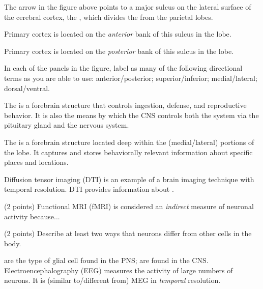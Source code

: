 \documentclass[]{exam}
\begin{document}
\begin{questions}
\question The arrow in the figure above points to a major sulcus on the lateral surface of the cerebral cortex, the \fillin, which divides the \fillin from the parietal lobes.

\question Primary \fillin cortex is located on the \emph{anterior} bank of this sulcus in the \fillin lobe.

\question Primary \fillin cortex is located on the \emph{posterior} bank of this sulcus in the \fillin lobe.

\question In each of the panels in the figure, label as many of the following directional terms as you are able to use: anterior/posterior; superior/inferior; medial/lateral; dorsal/ventral. 

\question The \fillin is a forebrain structure that controls ingestion, defense, and reproductive behavior. It is also the means by which the CNS controls both the \fillin system via the pituitary gland and the \fillin nervous system.

\question The \fillin is a forebrain structure located deep within the (medial/lateral) portions of the \fillin lobe. It captures and stores behaviorally relevant information about specific places and locations.


\question Diffusion tensor imaging (DTI) is an example of a brain imaging technique with \fillin temporal resolution. DTI provides information about \fillin.


\newpage

\question (2 points) Functional MRI (fMRI) is considered an \emph{indirect} measure of neuronal activity because...
\vspace{1.5in}

\question (2 points) Describe at least two ways that neurons differ from other cells in the body.
\vspace{1.5in}

\question \fillin are the type of glial cell found in the PNS; \fillin are found in the CNS.
\question Electroencephalography (EEG) measures the \fillin activity of large numbers of neurons. It is (similar to/different from) MEG in \emph{temporal} resolution.


\end{questions}
\end{document}
